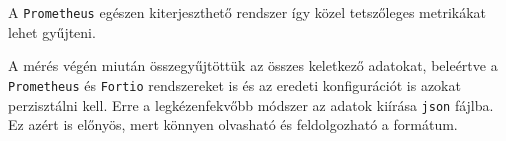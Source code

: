 A \verb+Prometheus+ egészen kiterjeszthető rendszer így közel tetszőleges metrikákat lehet gyűjteni. 


A mérés végén miután összegyűjtöttük az összes keletkező adatokat, beleértve a \verb+Prometheus+ és \verb+Fortio+ rendszereket is és az eredeti konfigurációt is azokat perzisztálni kell. Erre a legkézenfekvőbb módszer az adatok kiírása \verb+json+ fájlba. Ez azért is előnyös, mert könnyen olvasható és feldolgozható a formátum. 